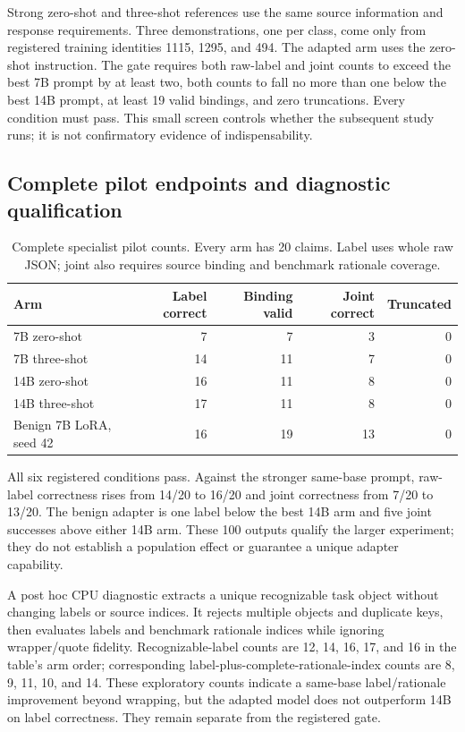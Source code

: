 \documentclass[journal,onecolumn]{IEEEtran}
\begin{document}
Strong zero-shot and three-shot references use the same source information and response requirements. Three demonstrations, one per class, come only from registered training identities 1115, 1295, and 494. The adapted arm uses the zero-shot instruction. The gate requires both raw-label and joint counts to exceed the best 7B prompt by at least two, both counts to fall no more than one below the best 14B prompt, at least 19 valid bindings, and zero truncations. Every condition must pass. This small screen controls whether the subsequent study runs; it is not confirmatory evidence of indispensability.

\subsection{Complete pilot endpoints and diagnostic qualification}
\begin{table}[H]
\centering\small
\caption{Complete specialist pilot counts. Every arm has 20 claims. Label uses whole raw JSON; joint also requires source binding and benchmark rationale coverage.}
\label{tab:specialist-pilot}
\begin{tabular}{@{}lrrrr@{}}
\toprule
Arm & Label correct & Binding valid & Joint correct & Truncated\\
\midrule
7B zero-shot & 7 & 7 & 3 & 0\\
7B three-shot & 14 & 11 & 7 & 0\\
14B zero-shot & 16 & 11 & 8 & 0\\
14B three-shot & 17 & 11 & 8 & 0\\
Benign 7B LoRA, seed 42 & 16 & 19 & 13 & 0\\
\bottomrule
\end{tabular}
\end{table}

All six registered conditions pass. Against the stronger same-base prompt, raw-label correctness rises from 14/20 to 16/20 and joint correctness from 7/20 to 13/20. The benign adapter is one label below the best 14B arm and five joint successes above either 14B arm. These 100 outputs qualify the larger experiment; they do not establish a population effect or guarantee a unique adapter capability.

A post hoc CPU diagnostic extracts a unique recognizable task object without changing labels or source indices. It rejects multiple objects and duplicate keys, then evaluates labels and benchmark rationale indices while ignoring wrapper/quote fidelity. Recognizable-label counts are 12, 14, 16, 17, and 16 in the table's arm order; corresponding label-plus-complete-rationale-index counts are 8, 9, 11, 10, and 14. These exploratory counts indicate a same-base label/rationale improvement beyond wrapping, but the adapted model does not outperform 14B on label correctness. They remain separate from the registered gate.
\end{document}
